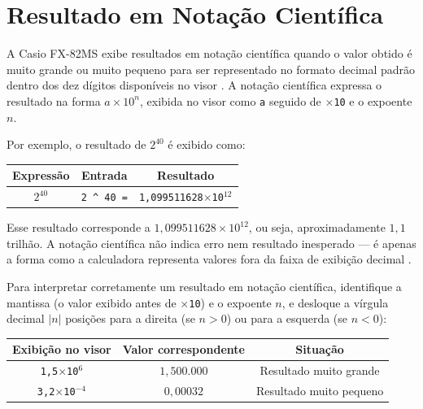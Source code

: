 \section{Resultado em Notação Científica}

A Casio FX-82MS exibe resultados em notação científica quando o valor obtido é muito grande ou muito pequeno para ser representado no formato decimal padrão dentro dos dez dígitos disponíveis no visor \cite{casio2004}. A notação científica expressa o resultado na forma $a \times 10^n$, exibida no visor como \texttt{a} seguido de \texttt{$\times$10} e o expoente $n$.

Por exemplo, o resultado de $2^{40}$ é exibido como:

\begin{table}[H]
    \centering
    \begin{tabular}{|c|c|c|}
        \hline
        \textbf{Expressão} & \textbf{Entrada} & \textbf{Resultado} \\ \hline
        $2^{40}$ & \texttt{2 \^{} 40 =} & \texttt{1{,}099511628$\times$10$^{12}$} \\ \hline
    \end{tabular}
\end{table}

Esse resultado corresponde a $1{,}099511628 \times 10^{12}$, ou seja, aproximadamente $1{,}1$ trilhão. A notação científica não indica erro nem resultado inesperado — é apenas a forma como a calculadora representa valores fora da faixa de exibição decimal \cite{casio2004}.

Para interpretar corretamente um resultado em notação científica, identifique a mantissa (o valor exibido antes de \texttt{$\times$10}) e o expoente $n$, e desloque a vírgula decimal $|n|$ posições para a direita (se $n > 0$) ou para a esquerda (se $n < 0$):

\begin{table}[H]
    \centering
    \begin{tabular}{|c|c|c|}
        \hline
        \textbf{Exibição no visor} & \textbf{Valor correspondente} & \textbf{Situação} \\ \hline
        \texttt{1{,}5$\times$10$^{6}$} & $1{,}500{.}000$ & Resultado muito grande \\
        \texttt{3{,}2$\times$10$^{-4}$} & $0{,}00032$ & Resultado muito pequeno \\ \hline
    \end{tabular}
\end{table}


